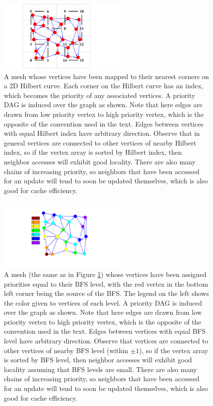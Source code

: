 \documentclass[journal]{IEEEtran}
\begin{document}
\begin{figure}[!t]
\centering
\includegraphics[trim=6cm 0cm 8cm 0cm, width=2.5in]{hilbert_priority_function}
\caption{A mesh whose vertices have been mapped to their nearest corners on a 2D Hilbert curve. Each corner on the Hilbert curve has an index, which becomes the priority of any associated vertices. A priority DAG is induced over the graph as shown. Note that here edges are drawn from low priority vertex to high priority vertex, which is the opposite of the convention used in the text. Edges between vertices with equal Hilbert index have arbitrary direction. Observe that in general vertices are connected to other vertices of nearby Hilbert index, so if the vertex array is sorted by Hilbert index, then neighbor accesses will exhibit good locality. There are also many chains of increasing priority, so neighbors that have been accessed for an update will tend to soon be updated themselves, which is also good for cache efficiency.}
\label{fig_hil_prio}
\end{figure}

\begin{figure}[!t]
\centering
\includegraphics[trim=8cm 2cm 8cm 2cm, width=2.5in]{bfs_priority}
\caption{A mesh (the same as in Figure \ref{fig_hil_prio}) whose vertices have been assigned priorities equal to their BFS level, with the red vertex in the bottom left corner being the source of the BFS. The legend on the left shows the color given to vertices of each level. A priority DAG is induced over the graph as shown. Note that here edges are drawn from low priority vertex to high priority vertex, which is the opposite of the convention used in the text. Edges between vertices with equal BFS level have arbitrary direction. Observe that vertices are connected to other vertices of nearby BFS level (within $\pm 1$), so if the vertex array is sorted by BFS level, then neighbor accesses will exhibit good locality assuming that BFS levels are small. There are also many chains of increasing priority, so neighbors that have been accessed for an update will tend to soon be updated themselves, which is also good for cache efficiency.}
\label{fig_bfs_prio}
\end{figure}
\end{document}
